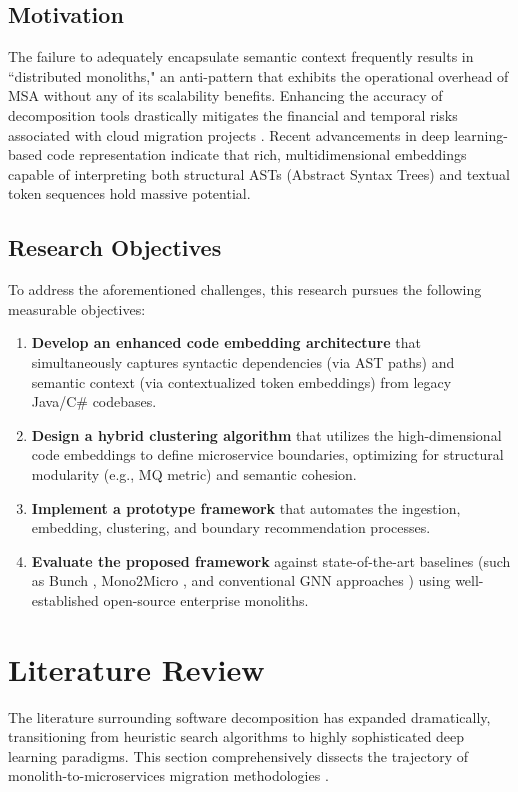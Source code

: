 \documentclass[12pt, a4paper]{article}
\begin{document}
\subsection{Motivation}
The failure to adequately encapsulate semantic context frequently results in ``distributed monoliths," an anti-pattern that exhibits the operational overhead of MSA without any of its scalability benefits. Enhancing the accuracy of decomposition tools drastically mitigates the financial and temporal risks associated with cloud migration projects \cite{kalia2021}. Recent advancements in deep learning-based code representation \cite{aldebagy2021, naik2024} indicate that rich, multidimensional embeddings capable of interpreting both structural ASTs (Abstract Syntax Trees) and textual token sequences hold massive potential.

\subsection{Research Objectives}
To address the aforementioned challenges, this research pursues the following measurable objectives:
\begin{enumerate}
    \item \textbf{Develop an enhanced code embedding architecture} that simultaneously captures syntactic dependencies (via AST paths) and semantic context (via contextualized token embeddings) from legacy Java/C\# codebases.
    \item \textbf{Design a hybrid clustering algorithm} that utilizes the high-dimensional code embeddings to define microservice boundaries, optimizing for structural modularity (e.g., MQ metric) and semantic cohesion.
    \item \textbf{Implement a prototype framework} that automates the ingestion, embedding, clustering, and boundary recommendation processes.
    \item \textbf{Evaluate the proposed framework} against state-of-the-art baselines (such as Bunch \cite{mitchell2007}, Mono2Micro \cite{kalia2020}, and conventional GNN approaches \cite{mathai2022}) using well-established open-source enterprise monoliths.
\end{enumerate}

\section{Literature Review}

The literature surrounding software decomposition has expanded dramatically, transitioning from heuristic search algorithms to highly sophisticated deep learning paradigms. This section comprehensively dissects the trajectory of monolith-to-microservices migration methodologies \cite{trabelsi2025}.
\end{document}
